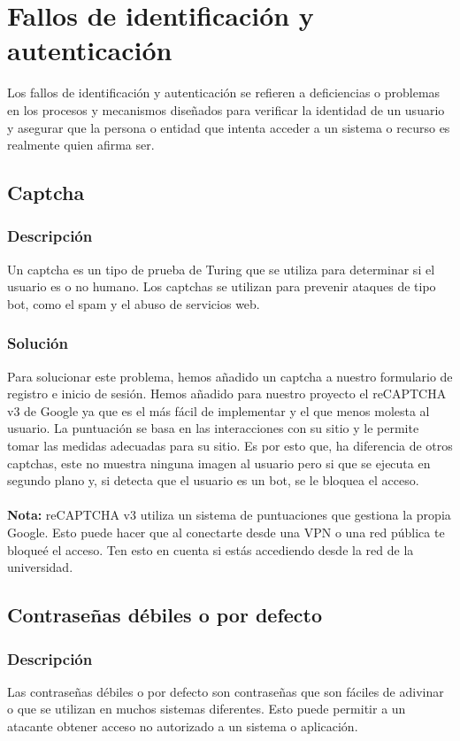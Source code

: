 \documentclass{report}
\begin{document}
        \section{Fallos de identificación y autenticación}
            Los fallos de identificación y autenticación se refieren a deficiencias o problemas en los procesos y mecanismos diseñados para verificar la identidad de un usuario y asegurar que la persona o entidad que intenta acceder a un sistema o recurso es realmente quien afirma ser. 
            \subsection{Captcha}
                \subsubsection{Descripción}
                    Un captcha es un tipo de prueba de Turing que se utiliza para determinar si el usuario es o no humano. Los captchas se utilizan para prevenir ataques de tipo bot, como el spam y el abuso de servicios web.
                \subsubsection{Solución}
                    Para solucionar este problema, hemos añadido un captcha a nuestro formulario de registro e inicio de sesión.
                    Hemos añadido para nuestro proyecto el reCAPTCHA v3 de Google ya que es el más fácil de implementar y el que menos molesta al usuario.
                    La puntuación se basa en las interacciones con su sitio y le permite tomar las medidas adecuadas para su sitio.
                    Es por esto que, ha diferencia de otros captchas, este no muestra ninguna imagen al usuario pero si que se ejecuta en segundo plano y, si detecta que el usuario es un bot, se le bloquea el acceso.
                    \\\\
                    \textbf{Nota:} reCAPTCHA v3 utiliza un sistema de puntuaciones que gestiona la propia Google. Esto puede hacer que al conectarte desde una VPN o una red pública te bloqueé el acceso. Ten esto en cuenta si estás accediendo desde la red de la universidad.
            \clearpage
            \subsection{Contraseñas débiles o por defecto}
                \subsubsection{Descripción}
                    Las contraseñas débiles o por defecto son contraseñas que son fáciles de adivinar o que se utilizan en muchos sistemas diferentes. Esto puede permitir a un atacante obtener acceso no autorizado a un sistema o aplicación.
\end{document}
